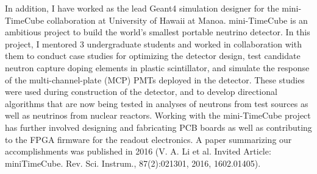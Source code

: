 \documentclass[10pt]{article} %
\begin{document}
%

In addition, I have worked as the lead Geant4 simulation designer for the
mini-TimeCube collaboration at University of Hawaii at Manoa. mini-TimeCube is
an ambitious project to build the world's smallest portable neutrino detector.
In this project, I mentored 3 undergraduate students and worked in
collaboration with them to conduct case studies for optimizing the detector
design, test candidate neutron capture doping elements in plastic scintillator,
and simulate the response of the multi-channel-plate (MCP) PMTs deployed in the
detector. These studies were used during construction of the detector, and to
develop directional algorithms that are now being tested in analyses of
neutrons from test sources as well as neutrinos from nuclear reactors.
Working with the mini-TimeCube project has further involved designing and
fabricating PCB boards as well as contributing to the FPGA firmware for the
readout electronics. A paper summarizing our accomplishments was published in
2016 (V. A. Li et al. Invited Article: miniTimeCube. Rev. Sci. Instrum.,
87(2):021301, 2016, 1602.01405).
\end{document}

